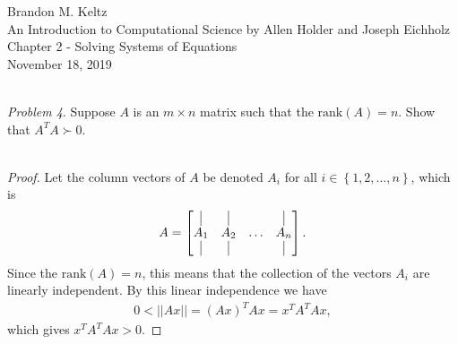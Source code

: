 \documentclass{article}
\begin{document}
	
	\begin{flushleft}	
	
		Brandon M. Keltz\\
		An Introduction to Computational Science by Allen Holder and Joseph Eichholz\\
		Chapter 2 - Solving Systems of Equations\\
		November 18, 2019\\\
		
		\textit{Problem 4}. Suppose $A$ is an $m \times n$ matrix such that the $\text{rank}(A) = n$. Show that $A^T A \succ 0$. \\\
		
		\begin{proof}
		
			Let the column vectors of $A$ be denoted $A_i$ for all $i \in \left\{ 1, 2, \ldots, n \right\}$, which is
			\begin{align*}
				A = \begin{bmatrix}
					\vline & \vline & \ & \vline \\
					A_1 & A_2 & \ldots & A_n \\
					\vline & \vline & \ & \vline
				\end{bmatrix}.
			\end{align*}
			Since the $\text{rank}(A) = n$, this means that the collection of the vectors $A_i$ are linearly independent. By this linear independence we have
			\begin{align*}
				0 < \left| \left| Ax \right| \right| = \left( Ax \right)^T Ax = x^T A^T A x,
			\end{align*}
			which gives $x^T A^T A x > 0$. 
		
		\end{proof}
	
	\end{flushleft}
	
\end{document}
